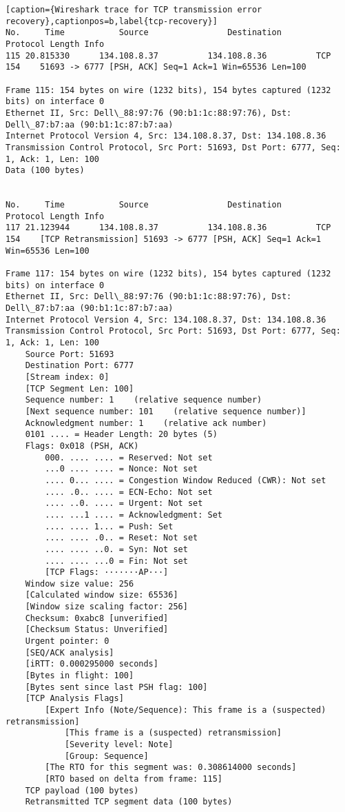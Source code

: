 \begin{lstlisting}[caption={Wireshark trace for TCP transmission error recovery},captionpos=b,label{tcp-recovery}]
No.     Time           Source                Destination           Protocol Length Info
115 20.815330      134.108.8.37          134.108.8.36          TCP      154    51693 -> 6777 [PSH, ACK] Seq=1 Ack=1 Win=65536 Len=100

Frame 115: 154 bytes on wire (1232 bits), 154 bytes captured (1232 bits) on interface 0
Ethernet II, Src: Dell\_88:97:76 (90:b1:1c:88:97:76), Dst: Dell\_87:b7:aa (90:b1:1c:87:b7:aa)
Internet Protocol Version 4, Src: 134.108.8.37, Dst: 134.108.8.36
Transmission Control Protocol, Src Port: 51693, Dst Port: 6777, Seq: 1, Ack: 1, Len: 100
Data (100 bytes)


No.     Time           Source                Destination           Protocol Length Info
117 21.123944      134.108.8.37          134.108.8.36          TCP      154    [TCP Retransmission] 51693 -> 6777 [PSH, ACK] Seq=1 Ack=1 Win=65536 Len=100

Frame 117: 154 bytes on wire (1232 bits), 154 bytes captured (1232 bits) on interface 0
Ethernet II, Src: Dell\_88:97:76 (90:b1:1c:88:97:76), Dst: Dell\_87:b7:aa (90:b1:1c:87:b7:aa)
Internet Protocol Version 4, Src: 134.108.8.37, Dst: 134.108.8.36
Transmission Control Protocol, Src Port: 51693, Dst Port: 6777, Seq: 1, Ack: 1, Len: 100
	Source Port: 51693
	Destination Port: 6777
	[Stream index: 0]
	[TCP Segment Len: 100]
	Sequence number: 1    (relative sequence number)
	[Next sequence number: 101    (relative sequence number)]
	Acknowledgment number: 1    (relative ack number)
	0101 .... = Header Length: 20 bytes (5)
	Flags: 0x018 (PSH, ACK)
		000. .... .... = Reserved: Not set
		...0 .... .... = Nonce: Not set
		.... 0... .... = Congestion Window Reduced (CWR): Not set
		.... .0.. .... = ECN-Echo: Not set
		.... ..0. .... = Urgent: Not set
		.... ...1 .... = Acknowledgment: Set
		.... .... 1... = Push: Set
		.... .... .0.. = Reset: Not set
		.... .... ..0. = Syn: Not set
		.... .... ...0 = Fin: Not set
		[TCP Flags: ·······AP···]
	Window size value: 256
	[Calculated window size: 65536]
	[Window size scaling factor: 256]
	Checksum: 0xabc8 [unverified]
	[Checksum Status: Unverified]
	Urgent pointer: 0
	[SEQ/ACK analysis]
	[iRTT: 0.000295000 seconds]
	[Bytes in flight: 100]
	[Bytes sent since last PSH flag: 100]
	[TCP Analysis Flags]
		[Expert Info (Note/Sequence): This frame is a (suspected) retransmission]
			[This frame is a (suspected) retransmission]
			[Severity level: Note]
			[Group: Sequence]
		[The RTO for this segment was: 0.308614000 seconds]
		[RTO based on delta from frame: 115]
	TCP payload (100 bytes)
	Retransmitted TCP segment data (100 bytes)


\end{lstlisting}
